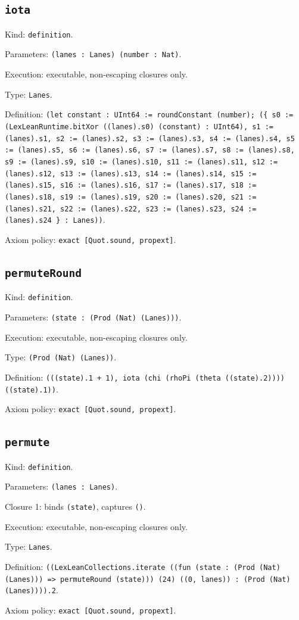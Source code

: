 \documentclass[11pt]{article}
\begin{document}
\subsection*{\texttt{iota}}
\noindent Kind: \texttt{definition}.\par
\noindent Parameters: \texttt{(lanes : Lanes) (number : Nat)}.\par
\noindent Execution: executable, non-escaping closures only.\par
\noindent Type: \texttt{Lanes}.\par
\noindent Definition: \texttt{(let constant : UInt64 := roundConstant (number); (\{ s0 := (LexLeanRuntime.bitXor ((lanes).s0) (constant) : UInt64), s1 := (lanes).s1, s2 := (lanes).s2, s3 := (lanes).s3, s4 := (lanes).s4, s5 := (lanes).s5, s6 := (lanes).s6, s7 := (lanes).s7, s8 := (lanes).s8, s9 := (lanes).s9, s10 := (lanes).s10, s11 := (lanes).s11, s12 := (lanes).s12, s13 := (lanes).s13, s14 := (lanes).s14, s15 := (lanes).s15, s16 := (lanes).s16, s17 := (lanes).s17, s18 := (lanes).s18, s19 := (lanes).s19, s20 := (lanes).s20, s21 := (lanes).s21, s22 := (lanes).s22, s23 := (lanes).s23, s24 := (lanes).s24 \} : Lanes))}.\par
\noindent Axiom policy: \texttt{exact [Quot.sound, propext]}.\par
\subsection*{\texttt{permuteRound}}
\noindent Kind: \texttt{definition}.\par
\noindent Parameters: \texttt{(state : (Prod (Nat) (Lanes)))}.\par
\noindent Execution: executable, non-escaping closures only.\par
\noindent Type: \texttt{(Prod (Nat) (Lanes))}.\par
\noindent Definition: \texttt{(((state).1 + 1), iota (chi (rhoPi (theta ((state).2)))) ((state).1))}.\par
\noindent Axiom policy: \texttt{exact [Quot.sound, propext]}.\par
\subsection*{\texttt{permute}}
\noindent Kind: \texttt{definition}.\par
\noindent Parameters: \texttt{(lanes : Lanes)}.\par
\noindent Closure 1: binds \texttt{(state)}, captures \texttt{()}.\par
\noindent Execution: executable, non-escaping closures only.\par
\noindent Type: \texttt{Lanes}.\par
\noindent Definition: \texttt{((LexLeanCollections.iterate ((fun (state : (Prod (Nat) (Lanes))) => permuteRound (state))) (24) ((0, lanes)) : (Prod (Nat) (Lanes)))).2}.\par
\noindent Axiom policy: \texttt{exact [Quot.sound, propext]}.\par
\end{document}
